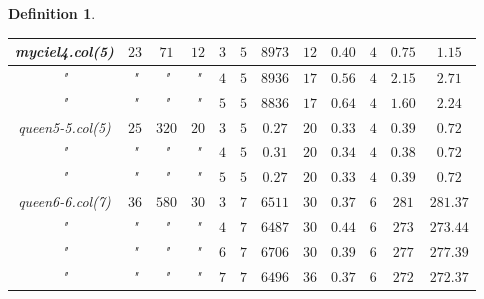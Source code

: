\documentclass[12pt]{article}
\theoremstyle{slplain}
\newtheorem{defi}{Definition}
\begin{document}
\begin{defi}
\begin{enumerate}
\begin{table}[H]
\begin{center}
\begin{tabular}{|c|c|c|c|c|c|c|c|c|c|c|c|}
\hline
\hline
{\small myciel4.col(5)} & {\small $23$} & {\small $71$} & {\small $12$} & {\small $3$} & {\small $5$} & {\small $8973$} & {\small $12$} & {\small $0.40$} & {\small $4$} & {\small $0.75$	} & {\small $1.15$}\\
\hline
{\small "} & {\small "} & {\small "} & {\small "} & {\small $4$} & {\small $5$} & {\small $8936$} & {\small $17$} & {\small $0.56$} & {\small $4$} & {\small $2.15$} & {\small $2.71$}\\
\hline
{\small "} & {\small "} & {\small "} & {\small "} & {\small $5$} & {\small $5$} & {\small $8836$} & {\small $17$} & {\small $0.64$} & {\small $4$} & {\small $1.60$} & {\small $2.24$}\\
\hline
\hline
{\small queen5-5.col(5)} & {\small $25$} & {\small $320$} & {\small $20$} & {\small $3$} & {\small $5$} & {\small $0.27$} & {\small $20$} & {\small $0.33$} & {\small $4$} & {\small $0.39$} & {\small $0.72$}\\
\hline
{\small "} & {\small "} & {\small "} & {\small "} & {\small $4$} & {\small $5$} & {\small $0.31$} & {\small $20$} & {\small $0.34$} & {\small $4$} & {\small $0.38$} & {\small $0.72$}\\
\hline
{\small "} & {\small "} & {\small "} & {\small "} & {\small $5$} & {\small $5$} & {\small $0.27$} & {\small $20$} & {\small $0.33$} & {\small $4$} & {\small $0.39$} & {\small $0.72$}\\
\hline
\hline
{\small queen6-6.col(7)} & {\small $36$} & {\small $580$} & {\small $30$} & {\small $3$} & {\small $7$} & {\small $6511$} & {\small $30$} & {\small $0.37$} & {\small $6$} & {\small $281$} & {\small $281.37$}\\
\hline
{\small "} & {\small "} & {\small "} & {\small "} & {\small $4$} & {\small $7$} & {\small $6487$} & {\small $30$} & {\small $0.44$} & {\small $6$} & {\small $273$} & {\small $273.44$}\\
\hline
{\small "} & {\small "} & {\small "} & {\small "} & {\small $6$} & {\small $7$} & {\small $6706$} & {\small $30$} & {\small $0.39$} & {\small $6$} & {\small $277$} & {\small $277.39$}\\
\hline
{\small "} & {\small "} & {\small "} & {\small "} & {\small $7$} & {\small $7$} & {\small $6496$} & {\small $36$} & {\small $0.37$} & {\small $6$} & {\small $272$} & {\small $272.37$}\\

\end{tabular}
\end{center}
\end{table}
\end{enumerate}
\end{defi}
\end{document}
